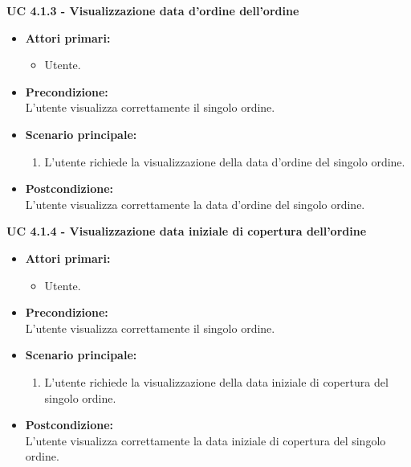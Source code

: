 \vspace{0.4cm}

\newpage

\noindent \textbf{\large UC 4.1.3 - Visualizzazione data d'ordine dell'ordine}
\label{uc:visualizzazione-data-ordine}
\begin{itemize}

	\item \textbf{Attori primari: }
		\begin{itemize}
			\item Utente.
		\end{itemize}

	\item \textbf{Precondizione: }\\[0.3cm]
		L'utente visualizza correttamente il singolo ordine.

	\item \textbf{Scenario principale: }
		\begin{enumerate}
			\item L'utente richiede la visualizzazione della data d'ordine del singolo ordine.
		\end{enumerate}
		

	\item \textbf{Postcondizione: }\\[0.3cm]
		L'utente visualizza correttamente la data d'ordine del singolo ordine.

\end{itemize}

\vspace{0.4cm}

\noindent \textbf{\large UC 4.1.4 - Visualizzazione data iniziale di copertura dell'ordine}
\label{uc:visualizzazione-data-iniziale-copertura}
\begin{itemize}

	\item \textbf{Attori primari: }
		\begin{itemize}
			\item Utente.
		\end{itemize}

	\item \textbf{Precondizione: }\\[0.3cm]
		L'utente visualizza correttamente il singolo ordine.

	\item \textbf{Scenario principale: }
		\begin{enumerate}
			\item L'utente richiede la visualizzazione della data iniziale di copertura del singolo ordine.
		\end{enumerate}
		

	\item \textbf{Postcondizione: }\\[0.3cm]
		L'utente visualizza correttamente la data iniziale di copertura del singolo ordine.

\end{itemize}


